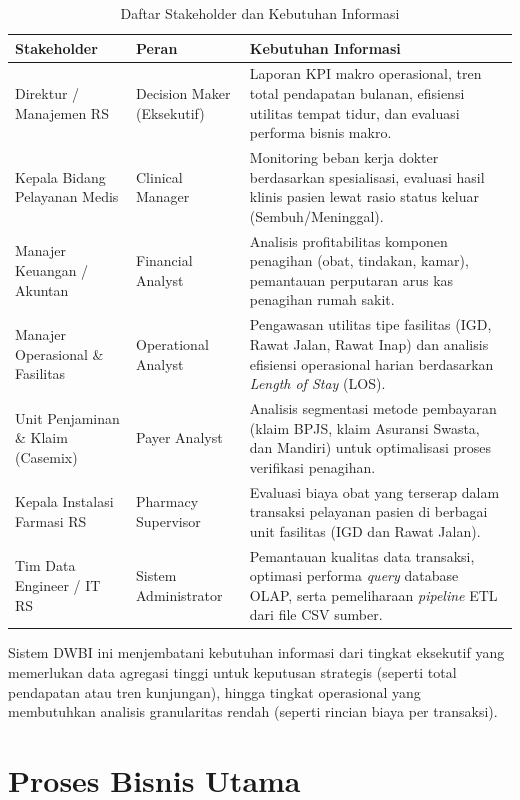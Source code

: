 \begin{table}[H]
\centering
\caption{Daftar Stakeholder dan Kebutuhan Informasi}
\small
\begin{tabularx}{\linewidth}{p{3.8cm}p{3cm}X}
\toprule
\textbf{Stakeholder} & \textbf{Peran} & \textbf{Kebutuhan Informasi} \\
\midrule
Direktur / Manajemen RS
  & Decision Maker (Eksekutif)
  & Laporan KPI makro operasional, tren total pendapatan bulanan, efisiensi utilitas tempat tidur, dan evaluasi performa bisnis makro. \\[3pt]
Kepala Bidang Pelayanan Medis
  & Clinical Manager
  & Monitoring beban kerja dokter berdasarkan spesialisasi, evaluasi hasil klinis pasien lewat rasio status keluar (Sembuh/Meninggal). \\[3pt]
Manajer Keuangan / Akuntan
  & Financial Analyst
  & Analisis profitabilitas komponen penagihan (obat, tindakan, kamar), pemantauan perputaran arus kas penagihan rumah sakit. \\[3pt]
Manajer Operasional \& Fasilitas
  & Operational Analyst
  & Pengawasan utilitas tipe fasilitas (IGD, Rawat Jalan, Rawat Inap) dan analisis efisiensi operasional harian berdasarkan \textit{Length of Stay} (LOS). \\[3pt]
Unit Penjaminan \& Klaim (Casemix)
  & Payer Analyst
  & Analisis segmentasi metode pembayaran (klaim BPJS, klaim Asuransi Swasta, dan Mandiri) untuk optimalisasi proses verifikasi penagihan. \\[3pt]
Kepala Instalasi Farmasi RS
  & Pharmacy Supervisor
  & Evaluasi biaya obat yang terserap dalam transaksi pelayanan pasien di berbagai unit fasilitas (IGD dan Rawat Jalan). \\[3pt]
Tim Data Engineer / IT RS
  & Sistem Administrator
  & Pemantauan kualitas data transaksi, optimasi performa \textit{query} database OLAP, serta pemeliharaan \textit{pipeline} ETL dari file CSV sumber. \\
\bottomrule
\end{tabularx}
\end{table}
 
Sistem DWBI ini menjembatani kebutuhan informasi dari tingkat eksekutif yang memerlukan data agregasi tinggi untuk keputusan strategis (seperti total pendapatan atau tren kunjungan), hingga tingkat operasional yang membutuhkan analisis granularitas rendah (seperti rincian biaya per transaksi).
 
\section{Proses Bisnis Utama}
 

